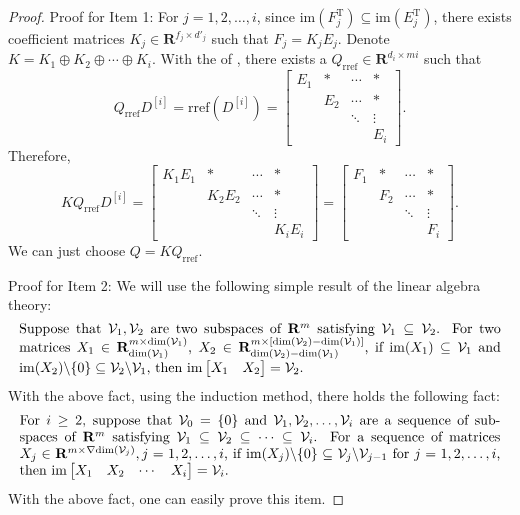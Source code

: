 \documentclass[sort&compress]{elsarticle}
\newcommand\rref{\mathrm{rref}}
\newcommand\im{\mathrm{im}}
\newcommand\imr[1]{\mathrm{im}(#1^\mathrm T)}
\newcommand\R{\mathbf R}
\begin{document}
{\renewcommand\proofname{Proof for \Cref{thm: QD=F}}
\begin{proof}
Proof for Item 1:
For $j=1,2,\dots,i$, since $\imr{F_j}\subseteq\imr{E_j}$,
there exists coefficient matrices
$K_j\in\R^{f_j\times d'_j}$ such that $F_j=K_jE_j$.
Denote $K=K_1\oplus K_2\oplus\cdots\oplus K_i$.
With the  of , there
exists a $Q_{\rref}\in\R^{d_i\times mi}$ such that
\[
Q_{\rref}D^{[i]}
=\rref(D^{[i]})
=\begin{bmatrix}
E_1&*&\cdots&*\\
&E_2&\cdots&*\\
&&\ddots&\vdots\\
&&&E_i
\end{bmatrix}.
\]
Therefore,
\[
KQ_{\rref}D^{[i]}=
\begin{bmatrix}
K_1E_1&*&\cdots&*\\
&K_2E_2&\cdots&*\\
&&\ddots&\vdots\\
&&&K_iE_i
\end{bmatrix}
=\begin{bmatrix}
F_1&*&\cdots&*\\
&F_2&\cdots&*\\
&&\ddots&\vdots\\
&&&F_i
\end{bmatrix}.
\]
We can just choose $Q=KQ_{\rref}$.

Proof for Item 2:
We will use the following simple result of the linear algebra theory:
\begin{equation*}
\begin{minipage}{\linewidth}
Suppose that $\mathcal V_1,\mathcal V_2$ are two subspaces of $\R^m$
satisfying $\mathcal V_1\subseteq\mathcal V_2$.
For two matrices $X_1\in\R^{m\times\dim(\mathcal V_1)}_{\dim(\mathcal V_1)}$,
$X_2\in\R^{m\times[\dim(\mathcal V_2)-\dim(\mathcal V_1)]}_{\dim(\mathcal V_2)-\dim(\mathcal V_1)}$,
if $\im(X_1)\subseteq\mathcal V_1$ and $\im(X_2)\backslash\{0\}\subseteq\mathcal V_2\backslash\mathcal V_1$,
then $\im\begin{bmatrix}X_1&X_2\end{bmatrix}=\mathcal V_2$.
\end{minipage}
\end{equation*}
With the above fact,
using the induction method,
there holds the following fact:
\begin{equation*}
\begin{minipage}{\linewidth}
For $i\ge2$,
suppose that $\mathcal V_0=\{0\}$ and $\mathcal V_1,\mathcal V_2,\dots,\mathcal V_i$ are a sequence of subspaces of $\R^m$
satisfying $\mathcal V_1\subseteq\mathcal V_2\subseteq\cdots\subseteq\mathcal V_i$.
For a sequence of matrices $X_j\in
\R^{m\times\nabla\!\dim(\mathcal V_j)},j=1,2,\dots,i$,
if $\im(X_j)\backslash\{0\}\subseteq\mathcal V_j\backslash\mathcal V_{j-1}$
for $j=1,2,\dots,i$,
then $\im\begin{bmatrix}X_1&X_2&\cdots&X_i\end{bmatrix}=\mathcal V_i$.
\end{minipage}
\end{equation*}
With the above fact,
one can easily prove this item.


\end{proof}}
\end{document}
